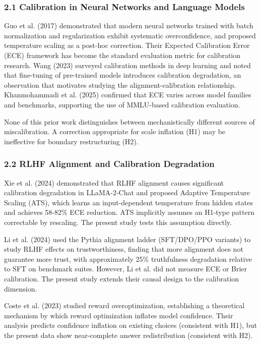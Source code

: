 
\subsubsection{2.1 Calibration in Neural Networks and Language Models}

Guo et al. (2017) demonstrated that modern neural networks trained with batch normalization and regularization exhibit systematic overconfidence, and proposed temperature scaling as a post-hoc correction. Their Expected Calibration Error (ECE) framework has become the standard evaluation metric for calibration research. Wang (2023) surveyed calibration methods in deep learning and noted that fine-tuning of pre-trained models introduces calibration degradation, an observation that motivates studying the alignment-calibration relationship. Khanmohammadi et al. (2025) confirmed that ECE varies across model families and benchmarks, supporting the use of MMLU-based calibration evaluation.

None of this prior work distinguishes between mechanistically different sources of miscalibration. A correction appropriate for scale inflation (H1) may be ineffective for boundary restructuring (H2).

\subsubsection{2.2 RLHF Alignment and Calibration Degradation}

Xie et al. (2024) demonstrated that RLHF alignment causes significant calibration degradation in LLaMA-2-Chat and proposed Adaptive Temperature Scaling (ATS), which learns an input-dependent temperature from hidden states and achieves 58-82\% ECE reduction. ATS implicitly assumes an H1-type pattern correctable by rescaling. The present study tests this assumption directly.

Li et al. (2024) used the Pythia alignment ladder (SFT/DPO/PPO variants) to study RLHF effects on trustworthiness, finding that more alignment does not guarantee more trust, with approximately 25\% truthfulness degradation relative to SFT on benchmark suites. However, Li et al. did not measure ECE or Brier calibration. The present study extends their causal design to the calibration dimension.

Coste et al. (2023) studied reward overoptimization, establishing a theoretical mechanism by which reward optimization inflates model confidence. Their analysis predicts confidence inflation on existing choices (consistent with H1), but the present data show near-complete answer redistribution (consistent with H2).

